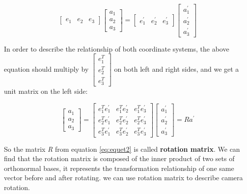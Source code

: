 \begin{equation*}\label{equet1}
 \begin{bmatrix} e_1 & e_2 & e_3 \end{bmatrix} 
 \begin{bmatrix} a_1 \\ a_2 \\ a_3 \end{bmatrix}
 = 
     \begin{bmatrix} e_1^{\prime} & e_2^{\prime} & e_3^{\prime} \end{bmatrix} 
     \begin{bmatrix} a_1^{\prime} \\ a_2^{\prime} \\ a_3^{\prime} \end{bmatrix}             
\end{equation*}

In order to describe the relationship of both coordinate systems, the above equation should multiply by $\begin{bmatrix} e_1^T \\ e_2^T \\ e_3^T \end{bmatrix}$ on both left and right sides, and we get a unit matrix on the left side:

\begin{equation}\label{eq:equet2}
 \begin{bmatrix} a_1 \\ a_2 \\ a_3 \end{bmatrix}
 = 
     \begin{bmatrix} e_1^Te_1^{\prime} & e_1^Te_2^{\prime} & e_1^Te_3^{\prime}\\
                     e_2^Te_1^{\prime} & e_2^Te_2^{\prime} & e_2^Te_3^{\prime}\\
                     e_3^Te_1^{\prime} & e_3^Te_2^{\prime} & e_3^Te_3^{\prime}
     \end{bmatrix}      
     \begin{bmatrix} a_1^{\prime} \\ a_2^{\prime} \\ a_3^{\prime} \end{bmatrix}             
 = Ra^{\prime}    
\end{equation}

So the matrix \textit{R} from equation \ref{eq:equet2} is called \textbf{rotation matrix}. We can find that the rotation matrix is composed of the inner product of two sets of orthonormal bases, it represents the transformation relationship of one same vector before and after rotating. we can use rotation matrix to describe camera rotation.

